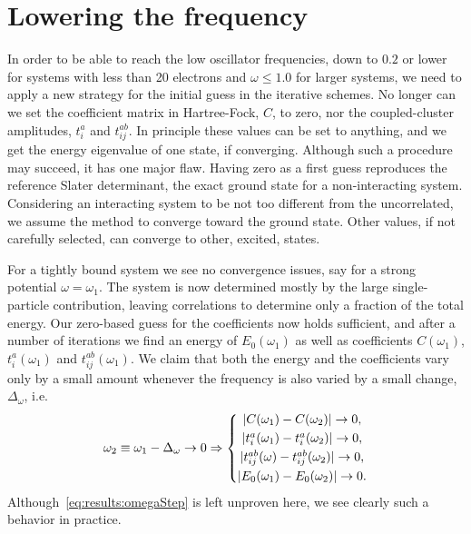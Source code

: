 \section{Lowering the frequency}
In order to be able to reach the low oscillator frequencies, down to $0.2$ or lower for systems with less than 20 electrons and $\omega \leq 1.0$ for larger systems, we need to apply a new strategy for the initial guess in the iterative schemes.
No longer can we set the coefficient matrix in Hartree-Fock, $C$, to zero, nor the coupled-cluster amplitudes, $t_i^a$ and $t_{ij}^{ab}$.
In principle these values can be set to anything, and we get the energy eigenvalue of one state, if converging.
Although such a procedure may succeed, it has one major flaw.
Having zero as a first guess reproduces the reference Slater determinant, the exact ground state for a non-interacting system.
Considering an interacting system to be not too different from the uncorrelated, we assume the method to converge toward the ground state.
Other values, if not carefully selected, can converge to other, excited, states.

For a tightly bound system we see no convergence issues, say for a strong potential $\omega = \omega_1$.
The system is now determined mostly by the large single-particle contribution, leaving correlations to determine only a fraction of the total energy.
Our zero-based guess for the coefficients now holds sufficient, and after a number of iterations we find an energy of $E_0(\omega_1)$ as well as coefficients $C(\omega_1)$, $t_i^a(\omega_1)$ and $t_{ij}^{ab}(\omega_1)$.
We claim that both the energy and the coefficients vary only by a small amount  whenever the frequency is also varied by a small change, $\Delta_{\omega}$, i.e.
\begin{equation}
\label{eq:results:omegaStep}
\omega_2 \equiv \omega_1 - \Delta_{\omega} \rightarrow 0 
\Rightarrow 
\left\lbrace
\begin{matrix}
| C(\omega_1) - C(\omega_2) | \rightarrow 0 , \vspace{1mm}\\
| t_i^a(\omega_1) - t_i^a(\omega_2) | \rightarrow 0 ,\vspace{1mm}\\
| t_{ij}^{ab}(\omega) - t_{ij}^{ab}(\omega_2) | \rightarrow 0 ,\vspace{1mm}\\
| E_0(\omega_1) - E_0(\omega_2) | \rightarrow 0 .
\end{matrix}
\right.
\end{equation}
Although~\eqref{eq:results:omegaStep} is left unproven here, we see clearly such a behavior in practice.

